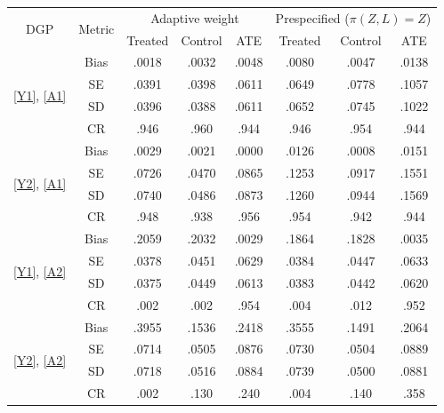 \begin{tabular}{cc| ccc |ccc}
\toprule
\multirow{2}{*}{DGP}&\multirow{2}{*}{Metric}&
\multicolumn{3}{c}{Adaptive weight}&\multicolumn{3}{|c}{Prespecified ($\pi(Z,L)=Z$)}\\
&& Treated & Control & ATE & Treated & Control & ATE\\
\midrule
\multirow{4}{*}{\ref{Y1}, \ref{A1}}
&Bias &.0018 &.0032 &.0048 &.0080 &.0047 &.0138 \\
&SE &.0391 &.0398 &.0611 &.0649 &.0778 &.1057 \\
&SD &.0396 &.0388 &.0611 &.0652 &.0745 &.1022 \\
&CR &.946 &.960 &.944 &.946 &.954 &.944 \\
[5pt]
\multirow{4}{*}{\ref{Y2}, \ref{A1}}
&Bias &.0029 &.0021 &.0000 &.0126 &.0008 &.0151 \\
&SE &.0726 &.0470 &.0865 &.1253 &.0917 &.1551 \\
&SD &.0740 &.0486 &.0873 &.1260 &.0944 &.1569 \\
&CR &.948 &.938 &.956 &.954 &.942 &.944 \\
[5pt]
\multirow{4}{*}{\ref{Y1}, \ref{A2}}
&Bias &.2059 &.2032 &.0029 &.1864 &.1828 &.0035 \\
&SE &.0378 &.0451 &.0629 &.0384 &.0447 &.0633 \\
&SD &.0375 &.0449 &.0613 &.0383 &.0442 &.0620 \\
&CR &.002 &.002 &.954 &.004 &.012 &.952 \\
[5pt]
\multirow{4}{*}{\ref{Y2}, \ref{A2}}
&Bias &.3955 &.1536 &.2418 &.3555 &.1491 &.2064 \\
&SE &.0714 &.0505 &.0876 &.0730 &.0504 &.0889 \\
&SD &.0718 &.0516 &.0884 &.0739 &.0500 &.0881 \\
&CR &.002 &.130 &.240 &.004 &.140 &.358 \\
\bottomrule
\end{tabular}
